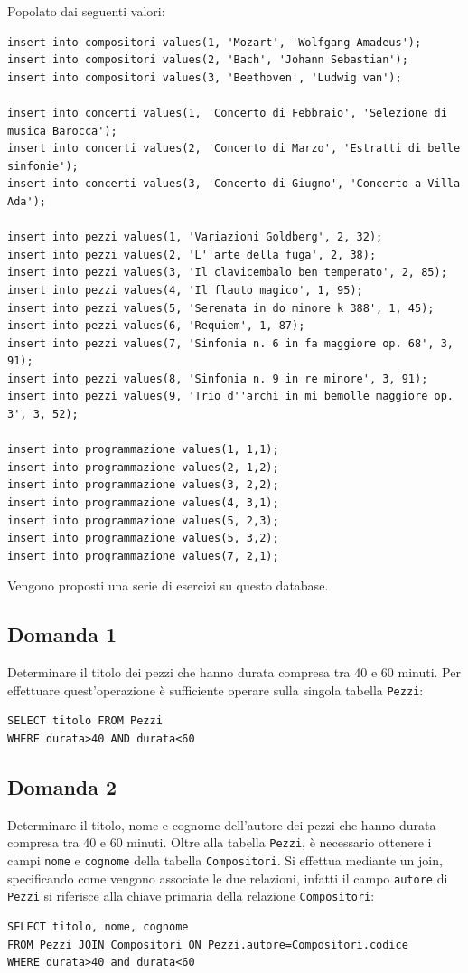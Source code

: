 \documentclass{article}
\numberwithin{equation}{subsection}
\begin{document}
Popolato dai seguenti valori:
\begin{verbatim}
insert into compositori values(1, 'Mozart', 'Wolfgang Amadeus');
insert into compositori values(2, 'Bach', 'Johann Sebastian');
insert into compositori values(3, 'Beethoven', 'Ludwig van');

insert into concerti values(1, 'Concerto di Febbraio', 'Selezione di musica Barocca');
insert into concerti values(2, 'Concerto di Marzo', 'Estratti di belle sinfonie');
insert into concerti values(3, 'Concerto di Giugno', 'Concerto a Villa Ada');

insert into pezzi values(1, 'Variazioni Goldberg', 2, 32);
insert into pezzi values(2, 'L''arte della fuga', 2, 38);
insert into pezzi values(3, 'Il clavicembalo ben temperato', 2, 85);
insert into pezzi values(4, 'Il flauto magico', 1, 95);
insert into pezzi values(5, 'Serenata in do minore k 388', 1, 45);
insert into pezzi values(6, 'Requiem', 1, 87);
insert into pezzi values(7, 'Sinfonia n. 6 in fa maggiore op. 68', 3, 91);
insert into pezzi values(8, 'Sinfonia n. 9 in re minore', 3, 91);
insert into pezzi values(9, 'Trio d''archi in mi bemolle maggiore op. 3', 3, 52);

insert into programmazione values(1, 1,1);
insert into programmazione values(2, 1,2);
insert into programmazione values(3, 2,2);
insert into programmazione values(4, 3,1);
insert into programmazione values(5, 2,3);
insert into programmazione values(5, 3,2);
insert into programmazione values(7, 2,1);
\end{verbatim}

Vengono proposti una serie di esercizi su questo database. 

\subsection{Domanda 1}
Determinare il titolo dei pezzi che hanno durata compresa tra 40 e 60 minuti. Per effettuare quest'operazione è sufficiente operare sulla singola tabella \verb|Pezzi|:
\begin{verbatim}
SELECT titolo FROM Pezzi
WHERE durata>40 AND durata<60
\end{verbatim}

\subsection{Domanda 2}
Determinare il titolo, nome e cognome dell'autore dei pezzi che hanno durata compresa tra 40 e 60 minuti. Oltre alla tabella \verb|Pezzi|, è necessario ottenere i campi 
\verb|nome| e \verb|cognome| della tabella \verb|Compositori|. Si effettua mediante un join, specificando come vengono associate le due relazioni, infatti il campo \verb|autore| 
di \verb|Pezzi| si riferisce alla chiave primaria della relazione \verb|Compositori|:
\begin{verbatim}
SELECT titolo, nome, cognome  
FROM Pezzi JOIN Compositori ON Pezzi.autore=Compositori.codice
WHERE durata>40 and durata<60
\end{verbatim}
\end{document}

